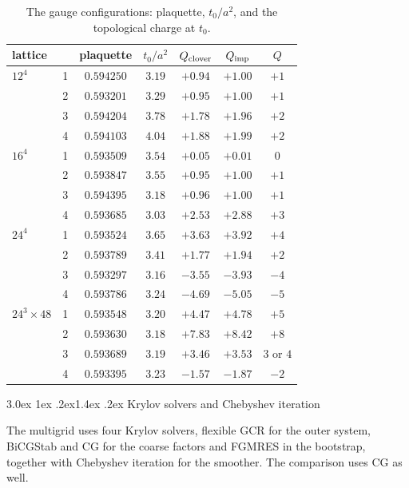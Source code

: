 \documentclass[11pt,a4paper]{article}
\makeatletter
\renewcommand\section{\@startsection{section}{1}{\z@}%
  {3.0ex \@plus 1ex \@minus .2ex}{1.4ex \@plus .2ex}%
  {\centering\normalfont\normalsize\bfseries}}
\newcommand\FloatBarrier{\par\begingroup\let\@elt\relax
  \edef\@tempa{\@botlist\@deferlist\@dbldeferlist}%
  \ifx\@tempa\@empty\else\clearpage\fi\endgroup}
\let\origsection\section
\renewcommand\section{\FloatBarrier\origsection}
\numberwithin{equation}{section}
\makeatother
\begin{document}
\begin{table}[tbp]
\centering
\caption{The gauge configurations: plaquette, $t_0/a^2$, and the topological charge at $t_0$.
}
\label{tab:configs}
\vspace{4pt}
\renewcommand{\arraystretch}{1.12}
\begin{tabular}{@{}lcccccc@{}}
\toprule
lattice & & plaquette & $t_0/a^2$ & $Q_{\rm clover}$ & $Q_{\rm imp}$ & $Q$\\
\midrule
$12^4$ & 1 & $0.594250$ & $3.19$ & $+0.94$ & $+1.00$ & $+1$\\
 & 2 & $0.593201$ & $3.29$ & $+0.95$ & $+1.00$ & $+1$\\
 & 3 & $0.594204$ & $3.78$ & $+1.78$ & $+1.96$ & $+2$\\
 & 4 & $0.594103$ & $4.04$ & $+1.88$ & $+1.99$ & $+2$\\
$16^4$ & 1 & $0.593509$ & $3.54$ & $+0.05$ & $+0.01$ & $0$\\
 & 2 & $0.593847$ & $3.55$ & $+0.95$ & $+1.00$ & $+1$\\
 & 3 & $0.594395$ & $3.18$ & $+0.96$ & $+1.00$ & $+1$\\
 & 4 & $0.593685$ & $3.03$ & $+2.53$ & $+2.88$ & $+3$\\
$24^4$ & 1 & $0.593524$ & $3.65$ & $+3.63$ & $+3.92$ & $+4$\\
 & 2 & $0.593789$ & $3.41$ & $+1.77$ & $+1.94$ & $+2$\\
 & 3 & $0.593297$ & $3.16$ & $-3.55$ & $-3.93$ & $-4$\\
 & 4 & $0.593786$ & $3.24$ & $-4.69$ & $-5.05$ & $-5$\\
$24^3\times48$ & 1 & $0.593548$ & $3.20$ & $+4.47$ & $+4.78$ & $+5$\\
 & 2 & $0.593630$ & $3.18$ & $+7.83$ & $+8.42$ & $+8$\\
 & 3 & $0.593689$ & $3.19$ & $+3.46$ & $+3.53$ & $3$ or $4$\\
 & 4 & $0.593395$ & $3.23$ & $-1.57$ & $-1.87$ & $-2$\\
\bottomrule
\end{tabular}
\end{table}

\section{Krylov solvers and Chebyshev iteration}
\label{sec:cgform}

The multigrid uses four Krylov solvers, flexible GCR for the outer system, BiCGStab and CG for
the coarse factors and FGMRES in the bootstrap, together with Chebyshev iteration for the smoother.
The comparison uses CG as well.
\end{document}
